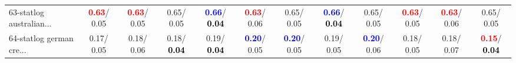 \begin{table}[h]
\begin{center}
{\begin{tabular}{lc|c|c|c|c|c|c|c|c|c|c}
63-statlog australian... & \textcolor{red}{\textbf{  0.63}}/  0.05 & \textcolor{red}{\textbf{  0.63}}/  0.05 &   0.65/  0.05 & \textcolor{blue}{\textbf{  0.66}}/\textcolor{black}{\textbf{  0.04}} & \textcolor{red}{\textbf{  0.63}}/  0.06 &   0.65/  0.05 & \textcolor{blue}{\textbf{  0.66}}/\textcolor{black}{\textbf{  0.04}} &   0.65/  0.05 & \textcolor{red}{\textbf{  0.63}}/  0.05 & \textcolor{red}{\textbf{  0.63}}/  0.06 &   0.65/  0.05 \\
64-statlog german cre... &   0.17/  0.05 &   0.18/  0.06 &   0.18/\textcolor{black}{\textbf{  0.04}} &   0.19/\textcolor{black}{\textbf{  0.04}} & \textcolor{blue}{\textbf{  0.20}}/  0.05 & \textcolor{blue}{\textbf{  0.20}}/  0.05 &   0.19/  0.05 & \textcolor{blue}{\textbf{  0.20}}/  0.06 &   0.18/  0.05 &   0.18/  0.07 & \textcolor{red}{\textbf{  0.15}}/\textcolor{black}{\textbf{  0.04}} \\\end{tabular}}\label{stratsALCKappa1aC4.5wRedux}
\end{center}
\end{table}
